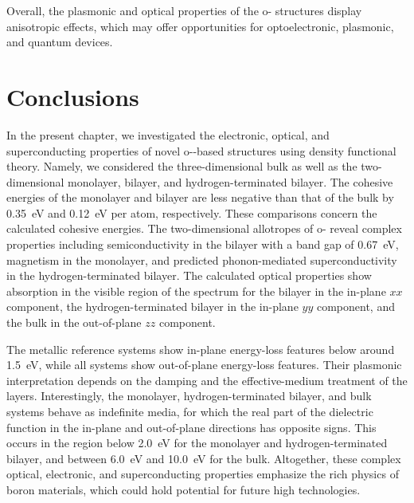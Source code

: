 Overall, the plasmonic and optical properties of the o- structures display anisotropic effects,
which may offer opportunities for optoelectronic,
plasmonic, and quantum devices.

\section{Conclusions}
\label{2_conclusions}

In the present chapter, we investigated the electronic, optical,
and superconducting properties of novel o--based structures using density functional theory.
Namely, we considered the three-dimensional bulk as well as the two-dimensional monolayer,
bilayer, and hydrogen-terminated bilayer.
The cohesive energies of the monolayer and bilayer are less negative than that of the bulk by \qty{0.35}{\electronvolt} and \qty{0.12}{\electronvolt} per atom, respectively.
These comparisons concern the calculated cohesive energies.
The two-dimensional allotropes of o- reveal complex properties including semiconductivity in the bilayer with a band gap of \qty{0.67}{\electronvolt},
magnetism in the monolayer, and predicted phonon-mediated superconductivity in the hydrogen-terminated bilayer.
The calculated optical properties show absorption in the visible region of the spectrum for the bilayer in the in-plane $xx$ component,
the hydrogen-terminated bilayer in the in-plane $yy$ component,
and the bulk in the out-of-plane $zz$ component.

The metallic reference systems show in-plane energy-loss features below around \qty{1.5}{\electronvolt},
while all systems show out-of-plane energy-loss features.
Their plasmonic interpretation depends on the damping and the effective-medium treatment of the layers.
Interestingly, the monolayer, hydrogen-terminated bilayer, and bulk systems behave as indefinite media,
for which the real part of the dielectric function in the in-plane and out-of-plane directions has opposite signs.
This occurs in the region below \qty{2.0}{\electronvolt} for the monolayer and hydrogen-terminated bilayer,
and between \qty{6.0}{\electronvolt} and \qty{10.0}{\electronvolt} for the bulk.
Altogether, these complex optical, electronic,
and superconducting properties emphasize the rich physics of boron materials,
which could hold potential for future high technologies.

